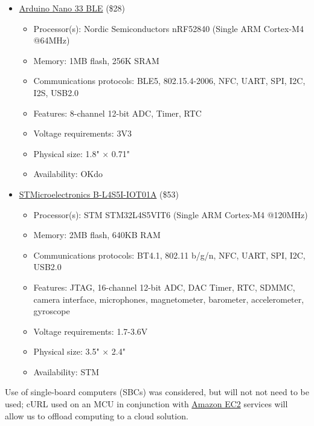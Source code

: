 \begin{flushleft}
\begin{itemize}
        \item
        \href{https://store-usa.arduino.cc/products/arduino-nano-33-ble?selectedStore=u}{Arduino Nano 33
        BLE} (\$28)
        \begin{itemize}
            \item Processor(s): Nordic Semiconductors nRF52840 (Single ARM Cortex-M4 @64MHz)
            \item Memory: 1MB flash, 256K SRAM
            \item Communications protocols: BLE5, 802.15.4-2006, NFC, UART, SPI, I2C, I2S, USB2.0
            \item Features: 8-channel 12-bit ADC, Timer, RTC
            \item Voltage requirements: 3V3
            \item Physical size: 1.8" $\times$ 0.71"
            \item Availability: OKdo
        \end{itemize}

        \item
        \href{https://www.st.com/en/evaluation-tools/b-l4s5i-iot01a.html}{STMicroelectronics 
        B-L4S5I-IOT01A} (\$53)
        \begin{itemize}
            \item Processor(s): STM STM32L4S5VIT6 (Single ARM Cortex-M4 @120MHz) 
            \item Memory: 2MB flash, 640KB RAM
            \item Communications protocols: BT4.1, 802.11 b/g/n, NFC, UART, SPI, I2C, USB2.0
            \item Features: JTAG, 16-channel 12-bit ADC, DAC Timer, RTC, SDMMC, camera interface,
            microphones, magnetometer, barometer, accelerometer, gyroscope
            \item Voltage requirements: 1.7-3.6V
            \item Physical size: 3.5" $\times$ 2.4"
            \item Availability: STM
        \end{itemize}
    \end{itemize}
\end{flushleft}
\begin{flushleft}
    Use of single-board computers (SBCs) was considered, but will not not need to be used; cURL 
    used on an MCU in conjunction with \href{https://aws.amazon.com/ec2/}{Amazon EC2} services will
    allow us to offload computing to a cloud solution.
\end{flushleft}
